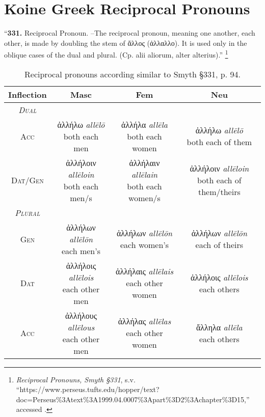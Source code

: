 \documentclass[10pt]{memoir}
\newcommand{\tsc}[1]{\textsc{#1}}
\newcommand{\grc}[1]{\fontspec{Inter}#1}
\newcommand{\trc}[1]{\textit{\fontspec{Tinos}#1}}
\newcommand{\linkfoot}[3]{\footnote{\emph{#1}, s.v. ``{#2},'' accessed \printdate{#3}.}}
\begin{document}
    \section*{Koine Greek Reciprocal Pronouns}

    ``\textbf{331.} Reciprocal Pronoun. --The reciprocal pronoun, meaning one another, each other, is made
    by doubling the stem of \grc{ἄλλος} (\grc{ἀλλαλλο}). \fontspec{} It is used only in the oblique cases of
    the dual and plural. (Cp. alii aliorum, alter alterius).''
    \linkfoot{Reciprocal Pronouns, Smyth §331}{https://www.perseus.tufts.edu/hopper/text?doc=Perseus\%3Atext\%3A1999.04.0007\%3Apart\%3D2\%3Achapter\%3D15}{2025-05-23}

    \begin{table}[H]
        \begin{tabular}{c|ccc}
            \textbf{Inflection} & \textbf{Masc} & \textbf{Fem} & \textbf{Neu} \\
            \hline
            \emph{\tsc{Dual}} \\
            \tsc{Acc} & \makecell{\grc{ἀλλήλω} \trc{allēlō} \\ \small both each men} & \makecell{\grc{ἀλλήλα} \trc{allēla} \\ \small both each women} & \makecell{\grc{ἀλλήλω} \trc{allēlō} \\ \small both each of them} \\
            \tsc{Dat/Gen} & \makecell{\grc{ἀλλήλοιν} \trc{allēloin} \\ \small both each men/s} & \makecell{\grc{ἀλλήλαιν} \trc{allēlain} \\ \small both each women/s} & \makecell{\grc{ἀλλήλοιν} \trc{allēloin} \\ \small both each of them/theirs} \\
            \hline
            \emph{\tsc{Plural}} \\
            \tsc{Gen} & \makecell{\grc{ἀλλήλων} \trc{allēlōn} \\ \small each men's} & \makecell{\grc{ἀλλήλων} \trc{allēlōn} \\ \small each women's} & \makecell{\grc{ἀλλήλων} \trc{allēlōn} \\ \small each of theirs} \\
            \tsc{Dat} & \makecell{\grc{ἀλλήλοις} \trc{allēlois} \\ \small each other men} & \makecell{\grc{ἀλλήλαις} \trc{allēlais}\\ \small each other women} & \makecell{\grc{ἀλλήλοις} \trc{allēlois} \\ \small each others } \\
            \tsc{Acc} & \makecell{\grc{ἀλλήλους} \trc{allēlous} \\ \small each other men} & \makecell{\grc{ἀλλήλας} \trc{allēlas} \\ \small each other women} & \makecell{\grc{ἄλληλα} \trc{allēla} \\ \small each others} \\
        \end{tabular}
        \caption{Reciprocal pronouns according similar to Smyth §331, p. 94.}
    \end{table}
\end{document}
